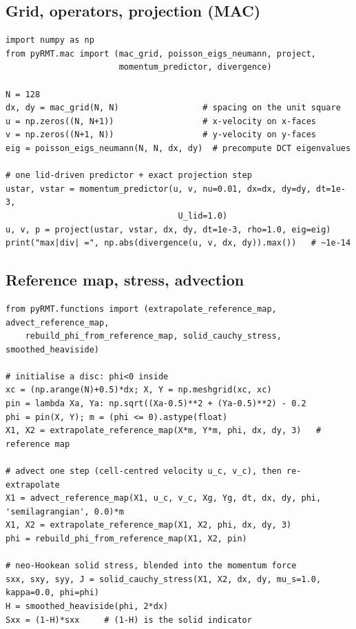 \documentclass[11pt]{article}
\begin{document}
\subsection{Grid, operators, projection (MAC)}
\begin{lstlisting}
import numpy as np
from pyRMT.mac import (mac_grid, poisson_eigs_neumann, project,
                       momentum_predictor, divergence)

N = 128
dx, dy = mac_grid(N, N)                 # spacing on the unit square
u = np.zeros((N, N+1))                  # x-velocity on x-faces
v = np.zeros((N+1, N))                  # y-velocity on y-faces
eig = poisson_eigs_neumann(N, N, dx, dy)  # precompute DCT eigenvalues

# one lid-driven predictor + exact projection step
ustar, vstar = momentum_predictor(u, v, nu=0.01, dx=dx, dy=dy, dt=1e-3,
                                   U_lid=1.0)
u, v, p = project(ustar, vstar, dx, dy, dt=1e-3, rho=1.0, eig=eig)
print("max|div| =", np.abs(divergence(u, v, dx, dy)).max())   # ~1e-14
\end{lstlisting}

\subsection{Reference map, stress, advection}
\begin{lstlisting}
from pyRMT.functions import (extrapolate_reference_map, advect_reference_map,
    rebuild_phi_from_reference_map, solid_cauchy_stress, smoothed_heaviside)

# initialise a disc: phi<0 inside
xc = (np.arange(N)+0.5)*dx; X, Y = np.meshgrid(xc, xc)
pin = lambda Xa, Ya: np.sqrt((Xa-0.5)**2 + (Ya-0.5)**2) - 0.2
phi = pin(X, Y); m = (phi <= 0).astype(float)
X1, X2 = extrapolate_reference_map(X*m, Y*m, phi, dx, dy, 3)   # reference map

# advect one step (cell-centred velocity u_c, v_c), then re-extrapolate
X1 = advect_reference_map(X1, u_c, v_c, Xg, Yg, dt, dx, dy, phi, 'semilagrangian', 0.0)*m
X1, X2 = extrapolate_reference_map(X1, X2, phi, dx, dy, 3)
phi = rebuild_phi_from_reference_map(X1, X2, pin)

# neo-Hookean solid stress, blended into the momentum force
sxx, sxy, syy, J = solid_cauchy_stress(X1, X2, dx, dy, mu_s=1.0, kappa=0.0, phi=phi)
H = smoothed_heaviside(phi, 2*dx)
Sxx = (1-H)*sxx     # (1-H) is the solid indicator
\end{lstlisting}
\end{document}
